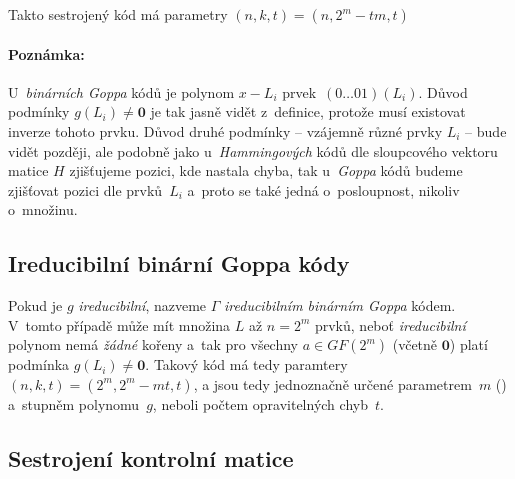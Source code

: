 \documentclass[thesis=M,czech,hidelinks]{FITthesis}[2012/06/26]
\newcommand{\0}{{\textcolor[gray]{0.75}{0}}}
\begin{document}
Takto sestrojený kód má parametry $(n,k,t) = (n,2^m-tm,t)$


\paragraph{Poznámka:} U~\emph{binárních Goppa} kódů je polynom $x - L_i$
prvek~$(0\ldots01)(L_i)$. Důvod podmínky $g(L_i) \neq \mathbf{0}$ je tak jasně
vidět z~definice, protože musí existovat inverze tohoto prvku. Důvod druhé
podmínky -- vzájemně různé prvky $L_i$ -- bude vidět později, ale podobně jako
u~\emph{Hammingových} kódů dle sloupcového vektoru matice $H$ zjišťujeme pozici,
kde nastala chyba, tak u~\emph{Goppa} kódů budeme zjišťovat pozici dle
prvků~$L_i$ a~proto se také jedná o~posloupnost, nikoliv o~množinu.


\subsection{Ireducibilní binární Goppa kódy}

Pokud je $g$ \emph{ireducibilní}, nazveme $\Gamma$ \emph{ireducibilním
binárním Goppa} kódem. V~tomto případě může mít množina $L$ až $n=2^m$ prvků,
neboť \emph{ireducibilní} polynom nemá \emph{žádné} kořeny a~tak pro všechny
$a \in GF(2^m)$ (včetně $\mathbf{0}$) platí podmínka $g(L_i) \neq \mathbf{0}$.
Takový kód má tedy paramtery $(n,k,t) = ( 2^m, 2^m - mt, t )$, a jsou tedy
jednoznačně určené parametrem~$m$ () a~stupněm
polynomu~$g$, neboli počtem opravitelných chyb~$t$.

\vfill


\subsection{Sestrojení kontrolní matice}
\end{document}
